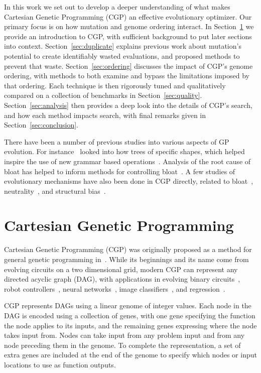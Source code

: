 \documentclass[journal]{IEEEtran}
\begin{document}
In this work we set out to develop a deeper understanding of what makes Cartesian
Genetic Programming (CGP) an effective evolutionary optimizer.  Our primary focus is
on how mutation and genome ordering interact.  In Section~\ref{sec:cgp} we provide
an introduction to CGP, with sufficient background to put later sections into
context.  Section~\ref{sec:duplicate} explains previous work about mutation's potential
to create identifiably wasted evaluations, and proposed methods to prevent that
waste.  Section~\ref{sec:ordering} discusses the impact of CGP's genome ordering,
with methods to both examine and bypass the limitations imposed by that ordering.
Each technique is then rigorously tuned and qualitatively compared on a collection
of benchmarks in Section~\ref{sec:quality}.  Section~\ref{sec:analysis} then
provides a deep look into the details of CGP's search, and how each method impacts
search, with final remarks given in Section~\ref{sec:conclusion}.

There have been a number of previous studies into various aspects of GP evolution.
For instance~\cite{daida3:2003:treebias} looked into how trees of specific shapes,
which helped inspire the use of new grammar based operations~\cite{xuan:2006:grammar}.
Analysis of the root cause of bloat has helped to inform methods for controlling
bloat~\cite{luke:2006:bloat}.  A few studies of evolutionary mechanisms have also
been done in CGP directly, related to bloat~\cite{miller:2001:bloat},
neutrality~\cite{vassilev:2000:neutrality}, and structural bias~\cite{payne:2009:bias}.


\section{Cartesian Genetic Programming}
\label{sec:cgp}
Cartesian Genetic Programming (CGP) was originally proposed as a method for general
genetic programming in~\cite{miller:2000:CGPorigin}.  While its beginnings and
its name come from evolving circuits on a two dimensional grid, modern CGP can
represent any directed acyclic graph (DAG), with applications in evolving binary
circuits~\cite{walker:2008:cgpmodules},
robot controllers~\cite{harding:2005:robots},
neural networks~\cite{khan:2010:cgpann},
image classifiers~\cite{harding:2012:mtcgp},
and regression~\cite{harding:2009:smcgp}.

CGP represents DAGs using a linear genome of integer values.  Each node in the
DAG is encoded using a collection of genes, with one gene specifying the function
the node applies to its inputs, and the remaining genes expressing where the
node takes input from.  Nodes can take input from any problem input and from
any node preceding them in the genome.  To complete the representation, a set
of extra genes are included at the end of the genome to specify which nodes or
input locations to use as function outputs.
\end{document}
